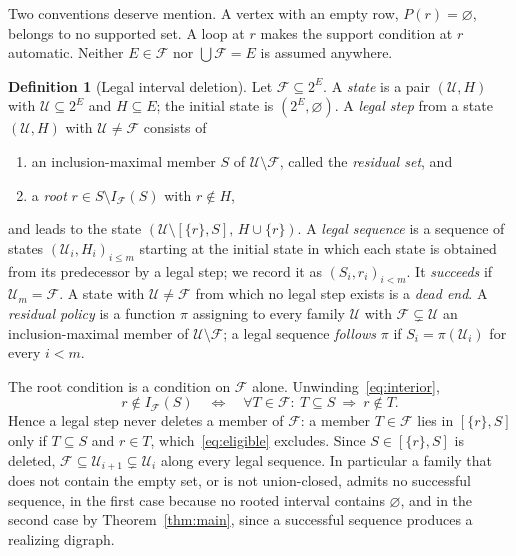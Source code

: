 \documentclass[11pt,a4paper]{article}
\theoremstyle{plain}
\theoremstyle{definition}
\newtheorem{definition}[theorem]{Definition}
\theoremstyle{remark}
\newcommand{\cF}{\mathcal F}
\newcommand{\cU}{\mathcal U}
\newcommand{\Int}{I_{\cF}}
\newcommand{\ivl}[2]{[\{#1\},#2]}
\newcommand{\pw}[1]{2^{#1}}
\begin{document}
Two conventions deserve mention. A vertex with an empty row, $P(r)=\varnothing$, belongs to no supported set. A loop at $r$ makes the support condition at $r$ automatic. Neither $E\in\cF$ nor $\bigcup\cF=E$ is assumed anywhere.

\begin{definition}[Legal interval deletion]\label{def:legal}
Let $\cF\subseteq\pw{E}$. A \emph{state} is a pair $(\cU,H)$ with $\cU\subseteq\pw{E}$ and $H\subseteq E$; the initial state is $(\pw{E},\varnothing)$. A \emph{legal step} from a state $(\cU,H)$ with $\cU\neq\cF$ consists of
\begin{enumerate}[label=(\roman*)]
\item an inclusion-maximal member $S$ of $\cU\setminus\cF$, called the \emph{residual set}, and
\item a \emph{root} $r\in S\setminus\Int(S)$ with $r\notin H$,
\end{enumerate}
and leads to the state $(\cU\setminus\ivl{r}{S},\,H\cup\{r\})$. A \emph{legal sequence} is a sequence of states $(\cU_i,H_i)_{i\le m}$ starting at the initial state in which each state is obtained from its predecessor by a legal step; we record it as $(S_i,r_i)_{i<m}$. It \emph{succeeds} if $\cU_m=\cF$. A state with $\cU\neq\cF$ from which no legal step exists is a \emph{dead end}. A \emph{residual policy} is a function $\pi$ assigning to every family $\cU$ with $\cF\subsetneq\cU$ an inclusion-maximal member of $\cU\setminus\cF$; a legal sequence \emph{follows} $\pi$ if $S_i=\pi(\cU_i)$ for every $i<m$.
\end{definition}

The root condition is a condition on $\cF$ alone. Unwinding~\eqref{eq:interior},
\begin{equation}\label{eq:eligible}
 r\notin\Int(S)\quad\Longleftrightarrow\quad\forall T\in\cF:\ T\subseteq S\ \Rightarrow\ r\notin T .
\end{equation}
Hence a legal step never deletes a member of $\cF$: a member $T\in\cF$ lies in $\ivl{r}{S}$ only if $T\subseteq S$ and $r\in T$, which~\eqref{eq:eligible} excludes. Since $S\in\ivl{r}{S}$ is deleted, $\cF\subseteq\cU_{i+1}\subsetneq\cU_i$ along every legal sequence. In particular a family that does not contain the empty set, or is not union-closed, admits no successful sequence, in the first case because no rooted interval contains $\varnothing$, and in the second case by Theorem~\ref{thm:main}, since a successful sequence produces a realizing digraph.
\end{document}
